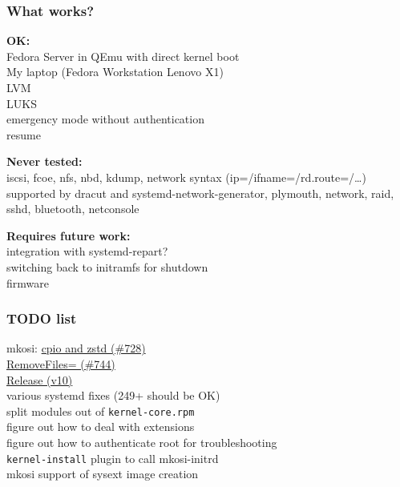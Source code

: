\documentclass[]{beamer}
\newcommand{\done}{\textcolor{teal}{\checkmark}}
\newcommand{\pull}[3]{\href{https://github.com/systemd/#1/pulls/#2}{#3 (\##2)}}
\newcommand{\pulldone}[3]{\pull{#1}{#2}{#3} \done}
\newcommand{\commit}[3]{\href{https://github.com/systemd/#1/commit/#2}{#3 (#2)}}
\newcommand{\commitdone}[3]{\commit{#1}{#2}{#3} \done}
\begin{document}
\begin{frame}
  \frametitle{What works?}

  \textbf{OK:}\\
  Fedora Server in QEmu with direct kernel boot\\
  My laptop (Fedora Workstation Lenovo X1)\\
  LVM\\
  LUKS\\
  emergency mode without authentication\\
  resume

  \bigskip

  \textbf{Never tested:}\\
  iscsi,
  fcoe,
  nfs,
  nbd,
  kdump,
  network syntax (ip=/ifname=/rd.route=/…) supported by dracut and systemd-network-generator,
  plymouth,
  network,
  raid,
  sshd,
  bluetooth,
  netconsole

  \bigskip

  \textbf{Requires future work:}\\
  integration with systemd-repart?\\
  switching back to initramfs for shutdown\\
  firmware
\end{frame}

\begin{frame}
  \frametitle{TODO list}

  mkosi: \pulldone{mkosi}{728}{cpio and zstd}\\
  \phantom{mkosi: }\pulldone{mkosi}{744}{RemoveFiles=}\\
  \phantom{mkosi: }\commitdone{mkosi}{v10}{Release}\\

  various systemd fixes (249+ should be OK)\\

  split modules out of \texttt{kernel-core.rpm}\\

  figure out how to deal with extensions\\
  figure out how to authenticate root for troubleshooting\\

  \texttt{kernel-install} plugin to call mkosi-initrd\\

  mkosi support of sysext image creation
\end{frame}
\end{document}
